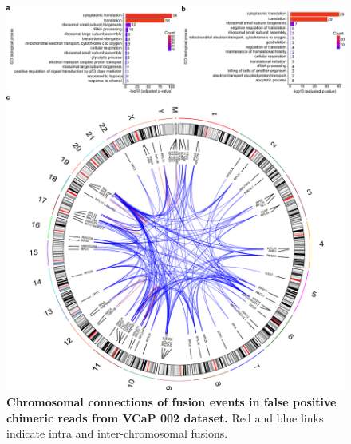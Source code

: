 \documentclass[pdflatex,sn-nature, lineno]{sn-jnl}%
\theoremstyle{thmstyleone}%
\theoremstyle{thmstyletwo}%
\theoremstyle{thmstylethree}%
\begin{document}
\begin{figure}[!h]
	\includegraphics[height=1.15\columnwidth]{finals/sf3}
	\caption{ {\bf Chromosomal connections of fusion events in false positive chimeric reads from VCaP 002 dataset.} Red and blue links indicate intra and inter-chromosomal fusions.}
	\label{fig:sf3}
\end{figure}

\end{document}
